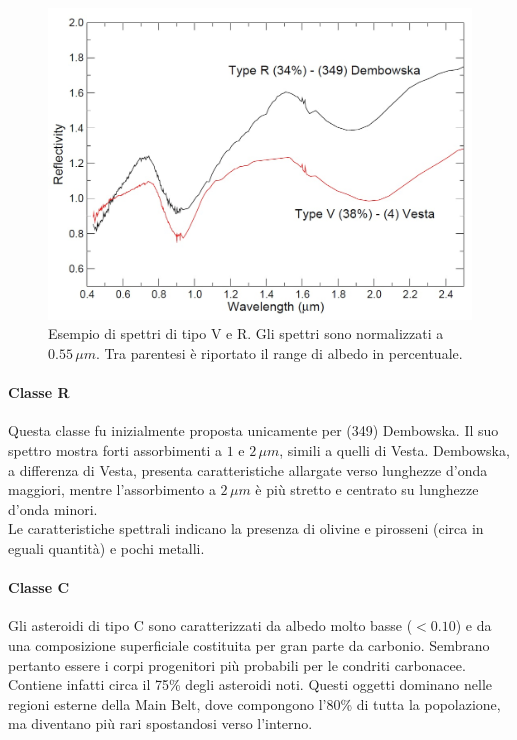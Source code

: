 \begin{figure}[!h]
    \centering
    \includegraphics[scale=0.3]{figure/spettro_rv.jpg}
    \caption[Esempio di spettri di tipo V e R.]{Esempio di spettri di tipo V e R. Gli spettri sono normalizzati a $0.55\,\mu m$. Tra parentesi è riportato il range di albedo in percentuale. \citep{magrin_spectroscopic_nodate}}
    \label{spettro_rv}
\end{figure}

\paragraph*{Classe R}
Questa classe fu inizialmente proposta unicamente per (349) Dembowska. Il suo spettro mostra forti assorbimenti a $1$ e $2\,\mu m$, simili a quelli di Vesta. Dembowska, a differenza di Vesta, presenta caratteristiche allargate verso lunghezze d'onda maggiori, mentre l'assorbimento a $2\,\mu m$ è più stretto e centrato su lunghezze d'onda minori.\\
Le caratteristiche spettrali indicano la presenza di olivine e pirosseni (circa in eguali quantità) e pochi metalli. 

\paragraph*{Classe C}
Gli asteroidi di tipo C sono caratterizzati da albedo molto basse ($<0.10$) e da una composizione superficiale costituita per gran parte da carbonio. Sembrano pertanto essere i corpi progenitori più probabili per le condriti carbonacee. Contiene infatti circa il 75\% degli asteroidi noti. Questi oggetti dominano nelle regioni esterne della Main Belt, dove compongono l'80\% di tutta la popolazione, ma diventano più rari spostandosi verso l'interno.\\

